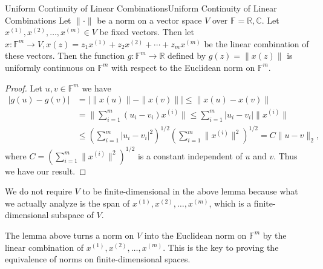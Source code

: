 \documentclass[../main.tex]{subfiles}
\begin{document}
\begin{lemma}{Uniform Continuity of Linear Combinations}{Uniform Continuity of Linear Combinations}
  Let $\|\cdot\|$ be a norm on a vector space $V$ over $\mathbb{F} = \mathbb{R}, \mathbb{C}$. Let $x^{(1)}, x^{(2)}, \ldots, x^{(m)} \in V$ be fixed vectors. Then let $x: \mathbb{F}^m \to V, x(z) = z_1 x^{(1)} + z_2 x^{(2)} + \cdots + z_m x^{(m)}$ be the linear combination of these vectors. Then the function $g: \mathbb{F}^m \to \mathbb{R}$ defined by $g(z) = \|x(z)\|$ is uniformly continuous on $\mathbb{F}^m$ with respect to the Euclidean norm on $\mathbb{F}^m$.
\end{lemma}
\begin{proof}
  Let $u,v\in \mathbb{F}^m$ we have
  \begin{equation*}
    \begin{aligned}
      |g(u) - g(v)| & = |\|x(u)\| - \|x(v)\|| \leq \|x(u) - x(v)\| \\
      & = \|\sum_{i=1}^m (u_i - v_i) x^{(i)}\| \leq \sum_{i=1}^m |u_i - v_i| \|x^{(i)}\| \\
      & \leq \left( \sum_{i=1}^m |u_i - v_i|^2 \right)^{1/2} \left( \sum_{i=1}^m \|x^{(i)}\|^2 \right)^{1/2} = C \|u - v\|_2,
    \end{aligned}
  \end{equation*}
  where $\displaystyle C = \left( \sum_{i=1}^m \|x^{(i)}\|^2 \right)^{1/2}$ is a constant independent of $u$ and $v$. Thus we have our result.
\end{proof}

\begin{remark}
  We do not require $V$ to be finite-dimensional in the above lemma because what we actually analyze is the span of $x^{(1)}, x^{(2)}, \ldots, x^{(m)}$, which is a finite-dimensional subspace of $V$.

  The lemma above turns a norm on $V$ into the Euclidean norm on $\mathbb{F}^m$ by the linear combination of $x^{(1)}, x^{(2)}, \ldots, x^{(m)}$. This is the key to proving the equivalence of norms on finite-dimensional spaces.
\end{remark}
\end{document}
